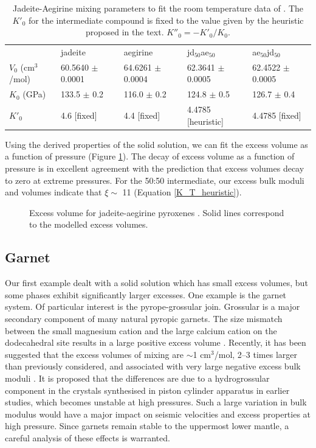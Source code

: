 \begin{table}[ht!]
\centering
\caption{Jadeite-Aegirine mixing parameters to fit the room temperature data of \cite{NBLBT2006}. The $K'_0$ for the intermediate compound is fixed to the value given by the heuristic proposed in the text. $K''_0 = -K'_0/K_0$.}
\label{tab:jd_aeg}
\begin{tabular}{lllll}
                   & jadeite              & aegirine             & jd$_{50}$ae$_{50}$             & ae$_{50}$jd$_{50}$             \\
$V_0$ (cm$^3$/mol) & 60.5640 $\pm$ 0.0001 & 64.6261 $\pm$ 0.0004 & 62.3641 $\pm$ 0.0005 & 62.4522 $\pm$ 0.0005 \\
$K_0$ (GPa)        & 133.5 $\pm$ 0.2      & 116.0 $\pm$ 0.2      & 124.8 $\pm$ 0.5      & 126.7 $\pm$ 0.4      \\
$K'_0$             & 4.6 [fixed]                 & 4.4 [fixed]                 & 4.4785 [heuristic]              & 4.4785  [fixed]           
\end{tabular}
\end{table}

Using the derived properties of the solid solution, we can fit the excess volume as a function of pressure (Figure \ref{fig:excess_volume_jadeite_aegirine}). The decay of excess volume as a function of pressure is in excellent agreement with the prediction that excess volumes decay to zero at extreme pressures. For the 50:50 intermediate, our excess bulk moduli and volumes indicate that $\xi \sim$ 11 (Equation \ref{K_T_heuristic}).

\begin{figure}[ht!]
  \centering
  \caption{Excess volume for jadeite-aegirine pyroxenes \citep{NBLBT2006}. Solid lines correspond to the modelled excess volumes.}
  \label{fig:excess_volume_jadeite_aegirine}
\end{figure}

\subsection{Garnet}
Our first example dealt with a solid solution which has small excess volumes, but some phases exhibit significantly larger excesses. One example is the garnet system. Of particular interest is the pyrope-grossular join. Grossular is a major secondary component of many natural pyropic garnets. The size mismatch between the small magnesium cation and the large calcium cation on the dodecahedral site results in a large positive excess volume \citep{NCK1977, BG1997, GCT1996}. Recently, it has been suggested that the excess volumes of mixing are $\sim$1 cm$^3$/mol, 2--3 times larger than previously considered, and associated with very large negative excess bulk moduli \citep{DCW2015}. It is proposed that the differences are due to a hydrogrossular component in the crystals synthesised in piston cylinder apparatus in earlier studies, which becomes unstable at high pressures. Such a large variation in bulk modulus would have a major impact on seismic velocities and excess properties at high pressure. Since garnets remain stable to the uppermost lower mantle, a careful analysis of these effects is warranted.

